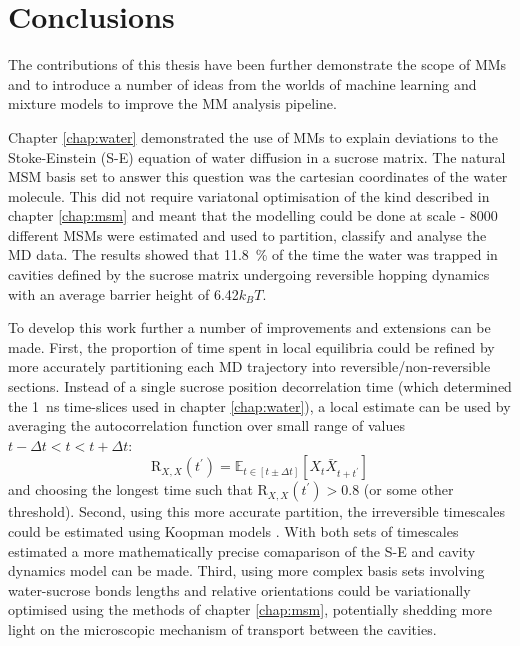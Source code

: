 \let\textcircled=\pgftextcircled
\chapter{Conclusions}
\label{chap:conclusions}


The contributions of this thesis have been further demonstrate the scope of MMs and to introduce a number of ideas from the worlds of machine learning and mixture models to improve the MM analysis pipeline. 

Chapter \ref{chap:water} demonstrated the use of MMs to explain deviations to the Stoke-Einstein (S-E) equation of water diffusion in a sucrose matrix. The natural MSM basis set to answer this question was the cartesian coordinates of the water molecule. This did not require variatonal optimisation of the kind described in chapter \ref{chap:msm} and meant that the modelling could be done at scale - 8000 different MSMs were estimated and used to partition, classify and analyse the MD data. The results showed that \SI{11.8}{\percent} of the time the water was trapped in cavities defined by the sucrose matrix undergoing reversible hopping dynamics with an average barrier height of \num{6.42}$k_{B}T$. 

To develop this work further a number of improvements and extensions can be made. First, the proportion of time spent in local equilibria could be refined by more accurately partitioning each MD trajectory into reversible/non-reversible sections. Instead of a single sucrose position decorrelation time (which determined the \SI{1}{\nano\second} time-slices used in chapter \ref{chap:water}), a local estimate can be used by averaging the autocorrelation function over small range of values $t-\Delta t < t < t+\Delta t$:
\begin{equation}
\mathrm{R}_{X,  X}(t^{\prime})=\mathbb{E}_{t \in [t\pm\Delta t]}\left[X_{t} \bar{X}_{t+t^{\prime}}\right]
\end{equation}
and choosing the longest time such that $\mathrm{R}_{X,  X}(t^{\prime}) > 0.8$ (or some other threshold). Second, using this more accurate partition, the irreversible timescales could be estimated using Koopman models \cite{wuVariationalKoopmanModels2017}. With both sets of timescales estimated a more mathematically precise comaparison of the S-E and cavity dynamics model can be made. Third, using more complex basis sets involving water-sucrose bonds lengths and relative orientations could be  variationally  optimised using the methods of chapter \ref{chap:msm}, potentially shedding more light on the microscopic mechanism of transport between the cavities. 

